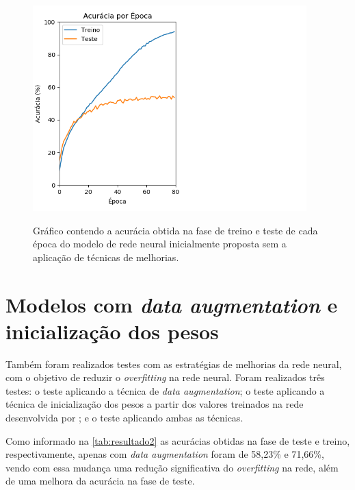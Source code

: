 

\begin{figure}[H]
  \centering
  \caption{Gráfico contendo a acurácia obtida na fase de treino e teste de cada época do modelo de rede neural inicialmente proposta sem a aplicação de técnicas de melhorias.}
  \includegraphics[width=300pt]{dados/figuras/resultado1}
  \label{fig:resultado1}
\end{figure}

\section{Modelos com \textit{data augmentation} e inicialização dos pesos}
Também foram realizados testes com as estratégias de melhorias da rede neural, com o objetivo de reduzir o \textit{overfitting} na rede neural. Foram realizados três testes: o teste aplicando a técnica de \textit{data augmentation}; o teste aplicando a técnica de inicialização dos pesos a partir dos valores treinados na rede desenvolvida por ; e o teste aplicando ambas as técnicas. 

\par Como informado na \autoref{tab:resultado2} as acurácias obtidas na fase de teste e treino, respectivamente, apenas com \textit{data augmentation} foram de 58,23\% e 71,66\%, vendo com essa mudança uma redução significativa do \textit{overfitting} na rede, além de uma melhora da acurácia na fase de teste.



